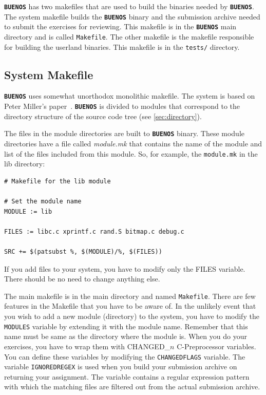\documentclass[twoside,a4paper]{report}
\newcommand{\buenos}{\texttt{\textbf{BUENOS}}}
\begin{document}
\buenos{} has two makefiles that are used to build the binaries needed
by \buenos{}. The system makefile builds the \buenos{} binary and the
submission archive needed to submit the exercises for reviewing. This
makefile is in the \buenos{} main directory and is called
\texttt{Makefile}. The other makefile is the makefile responsible for
building the userland binaries. This makefile is in the
\texttt{tests/} directory.

\subsection{System Makefile}

\buenos{} uses somewhat unorthodox monolithic makefile. The system
is based on Peter Miller's paper~\cite{miller}. \buenos{} is divided
to modules that correspond to the directory structure of the source
code tree (see \autoref{sec:directory}).


The files in the module directories are built to \buenos{} binary.
These module directories have a file called \textit{module.mk} that
contains the name of the module and list of the files included from
this module. So, for example, the \texttt{module.mk} in the lib
directory:
\begin{verbatim}
# Makefile for the lib module

# Set the module name
MODULE := lib

FILES := libc.c xprintf.c rand.S bitmap.c debug.c

SRC += $(patsubst %, $(MODULE)/%, $(FILES))
\end{verbatim}

If you add files to your system, you have to modify only the FILES
variable. There should be no need to change anything else.


The main makefile is in the main directory and named
\texttt{Makefile}. There are few features in the Makefile that you
have to be aware of. In the unlikely event that you wish to add a new
module (directory) to the system, you have to modify the
\texttt{MODULES} variable by extending it with the module name.
Remember that this name must be same as the directory where the module
is. When you do your exercises, you have to wrap them with
CHANGED\_$n$ C-Preprocessor variables. You can define these variables
by modifying the \texttt{CHANGEDFLAGS} variable. The variable
\texttt{IGNOREDREGEX} is used when you build your submission archive
on returning your assignment. The variable contains a regular
expression pattern with which the matching files are filtered out from
the actual submission archive.
\end{document}
